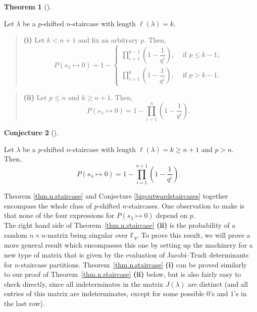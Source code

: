 \documentclass[numbers=enddot,12pt,final,onecolumn,notitlepage]{scrartcl}%
\theoremstyle{definition}
\newtheorem{theo}{Theorem}[section]
\newenvironment{theorem}[1][]
{\begin{theo}[#1]\begin{leftbar}}
{\end{leftbar}\end{theo}}
\newtheorem{conj}[theo]{Conjecture}
\newenvironment{conjecture}[1][]
{\begin{conj}[#1]\begin{leftbar}}
{\end{leftbar}\end{conj}}
\newenvironment{statement}{\begin{quote}}{\end{quote}}
\let\prodnonlimits\prod
\renewcommand{\prod}{\prodnonlimits\limits}
\newcommand{\tup}[1]{\left( #1 \right)}
\renewcommand{\leq}{\leqslant}
\renewcommand{\geq}{\geqslant}
\theoremstyle{plainsl}
\begin{document}
\begin{theorem}
\label{thm.n.staircase}

Let $\lambda$ be a $p$-shifted $n$-staircase with
length $\ell(\lambda) = k$.

\begin{statement}
\textbf{(i)} Let $k < n+1$ and fix an arbitrary $p$. Then,
\[
P(s_{\lambda} \longmapsto 0) =
1 -
\begin{cases}
\prod_{i=1}^{k-1} \left(  1-\dfrac{1}{q^{i}}\right) ,
& \text{ if } p \leq k-1; \\
\prod_{i=1}^{k} \left(  1-\dfrac{1}{q^{i}}\right) ,
& \text{ if } p > k-1.
\end{cases}
\]
\end{statement}
 
\begin{statement}
\textbf{(ii)} Let $p \leq n$ and $k \geq n+1$. Then, 
\[
P(s_{\lambda} \longmapsto 0) = 1- \prod_{i=1}^{n} \left(  1-\dfrac{1}{q^{i}}\right) .
\]
\end{statement}
\end{theorem}
\begin{conjecture}
\label{bigoutwardstaircases}
Let $\lambda$ be a $p$-shifted $n$-staircase with length $\ell(\lambda) = k \geq n+1$ and $p > n$.  Then,
\[
P(s_{\lambda} \longmapsto 0) = 1-\prod_{i=1}^{n+1} \left(  1-\dfrac{1}{q^{i}}\right).
\]
\end{conjecture}


Theorem \ref{thm.n.staircase} and Conjecture \ref{bigoutwardstaircases} together encompass the whole class of $p$-shifted $n$-staircases. One observation to make is that none of the four expressions for $P(s_{\lambda} \longmapsto 0)$ depend on $p$. \\

The right hand side of Theorem~\ref{thm.n.staircase} \textbf{(ii)}
is the probability of a random $n\times n$-matrix being singular over $\mathbb{F}_q$. To prove this result, we will prove a more general result which encompasses this one by setting up the machinery for a new type of matrix that is given by the evaluation of Jacobi--Trudi determinants for $n$-staircase partitions.  
Theorem~\ref{thm.n.staircase} \textbf{(i)} can be proved similarly to our proof of Theorem~\ref{thm.n.staircase} \textbf{(ii)} below,
but is also fairly easy to check directly, since all indeterminates
in the matrix $J\tup{\lambda}$ are distinct (and all entries of this
matrix are indeterminates, except for some possible $0$'s and $1$'s
in the last row).
\end{document}
